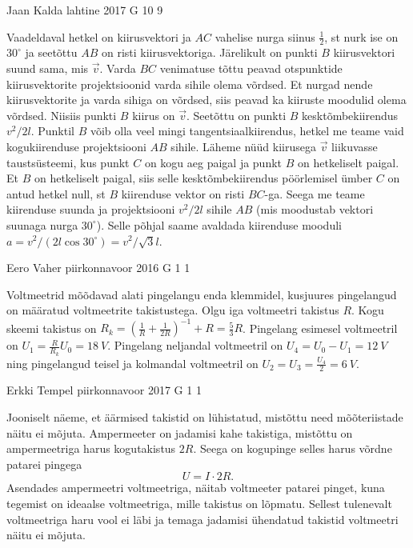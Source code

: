 \documentclass[11pt, twoside]{article}
\begin{document}
{{\fi
}

{Jaan Kalda} %
{lahtine} %
{2017} %
{G 10} %
{9} %
{

\ifSolution
Vaadeldaval hetkel on kiirusvektori ja $AC$ vahelise nurga siinus $\frac 12$, st nurk ise on $30^\circ$ ja seetõttu $AB$ on risti kiirusvektoriga. Järelikult on punkti $B$ kiirusvektori suund sama, mis $\vec v$. Varda $BC$ venimatuse tõttu peavad otspunktide kiirusvektorite projektsioonid varda sihile olema võrdsed. Et nurgad nende kiirusvektorite ja varda sihiga on võrdsed, siis peavad ka kiiruste moodulid olema võrdsed. Niisiis punkti $B$ kiirus on $\vec v$. Seetõttu on punkti $B$ kesktõmbekiirendus $v^2/2l$. Punktil $B$ võib olla veel mingi tangentsiaalkiirendus, hetkel me teame vaid kogukiirenduse projektsiooni $AB$ sihile. Läheme nüüd kiirusega $\vec v$ liikuvasse taustsüsteemi, kus punkt $C$ on kogu aeg paigal ja punkt $B$ on hetkeliselt paigal. Et $B$ on hetkeliselt paigal, siis selle kesktõmbekiirendus pöörlemisel ümber $C$ on antud hetkel null, st $B$ kiirenduse vektor on risti $BC$-ga. Seega me teame kiirenduse suunda ja projektsiooni $v^2/2l$ sihile $AB$ (mis moodustab vektori suunaga nurga $30^\circ$). Selle põhjal saame avaldada kiirenduse mooduli $a=v^2/(2l\cos30^\circ)=v^2/\sqrt 3l$.
\fi
}

{Eero Vaher} %
{piirkonnavoor} %
{2016} %
{G 1} %
{1} %
{

\ifSolution
Voltmeetrid mõõdavad alati pingelangu enda klemmidel, kusjuures pingelangud on määratud voltmeetrite takistustega. Olgu iga voltmeetri takistus $R$. Kogu skeemi takistus on $R_k=\left(\frac{1}{R}+\frac{1}{2R}\right)^{-1}+R=\frac{5}{3}R$. Pingelang esimesel voltmeetril on $U_1=\frac{R}{R_k}U_0=\SI{18}{V}$. Pingelang neljandal voltmeetril on $U_4=U_0-U_1=\SI{12}{V}$ ning pingelangud teisel ja kolmandal voltmeetril on $U_2=U_3=\frac{U_4}{2}=\SI{6}{V}$.
\fi
}

{Erkki Tempel} %
{piirkonnavoor} %
{2017} %
{G 1} %
{1} %
{

\ifSolution
Jooniselt näeme, et äärmised takistid on lühistatud, mistõttu need mõõteriistade näitu ei mõjuta. Ampermeeter on jadamisi kahe takistiga, mistõttu on ampermeetriga harus kogutakistus $2R$. Seega on kogupinge selles harus võrdne patarei pingega
\[ U = I\cdot 2R.\]
Asendades ampermeetri voltmeetriga, näitab voltmeeter patarei pinget, kuna tegemist on ideaalse voltmeetriga, mille takistus on lõpmatu. Sellest tulenevalt voltmeetriga haru vool ei läbi ja temaga jadamisi ühendatud takistid voltmeetri näitu ei mõjuta.

}}
\end{document}
